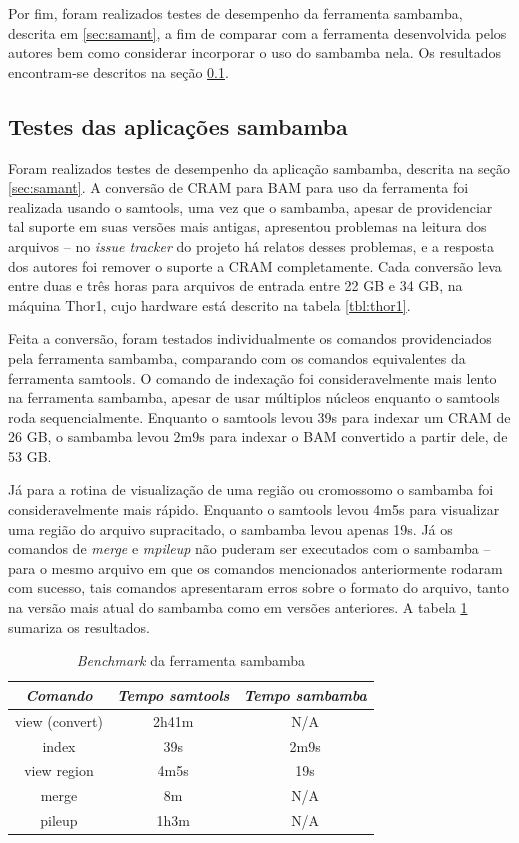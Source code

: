 \documentclass[cic,tc]{iiufrgs}
\begin{document}
Por fim, foram realizados testes de desempenho da ferramenta sambamba, descrita
em \ref{sec:samant}, a fim de comparar com a ferramenta desenvolvida pelos
autores bem como considerar incorporar o uso do sambamba nela. Os resultados
encontram-se descritos na seção \ref{sec:sambamba}.

\subsection{Testes das aplicações sambamba}
\label{sec:sambamba}

Foram realizados testes de desempenho da aplicação sambamba, descrita na seção
\ref{sec:samant}. A conversão de CRAM para BAM para uso da ferramenta foi
realizada usando o samtools, uma vez que o sambamba, apesar de providenciar tal
suporte em suas versões mais antigas, apresentou problemas na leitura dos
arquivos -- no \textit{issue tracker} do projeto há relatos desses problemas, e
a resposta dos autores foi remover o suporte a CRAM completamente. Cada
conversão leva entre duas e três horas para arquivos de entrada entre 22 GB e
34 GB, na máquina Thor1, cujo hardware está descrito na tabela \ref{tbl:thor1}.

Feita a conversão, foram testados individualmente os comandos providenciados
pela ferramenta sambamba, comparando com os comandos equivalentes da ferramenta
samtools. O comando de indexação foi consideravelmente mais lento na ferramenta
sambamba, apesar de usar múltiplos núcleos enquanto o samtools roda
sequencialmente. Enquanto o samtools levou 39s para indexar um CRAM de 26 GB, o
sambamba levou 2m9s para indexar o BAM convertido a partir dele, de 53 GB.

Já para a rotina de visualização de uma região ou cromossomo o sambamba foi
consideravelmente mais rápido. Enquanto o samtools levou 4m5s para visualizar
uma região do arquivo supracitado, o sambamba levou apenas 19s. Já os comandos
de \textit{merge} e \textit{mpileup} não puderam ser executados com o sambamba
-- para o mesmo arquivo em que os comandos mencionados anteriormente rodaram
com sucesso, tais comandos apresentaram erros sobre o formato do arquivo, tanto
na versão mais atual do sambamba como em versões anteriores. A tabela
\ref{tbl:sambamba} sumariza os resultados.

\begin{table}[h]
  \caption{\textit{Benchmark} da ferramenta sambamba}
    \centering
        \begin{tabular}{c|c|c}
          \hline
          \textit{Comando}  &   \textit{Tempo samtools}  & \textit{Tempo sambamba} \\
          \hline
          \hline
          view (convert) & 2h41m & N/A \\
          index & 39s & 2m9s \\
          view region & 4m5s & 19s \\
          merge & 8m & N/A \\
          pileup & 1h3m & N/A \\
          \hline
        \end{tabular}
    \label{tbl:sambamba}
\end{table}
\end{document}
